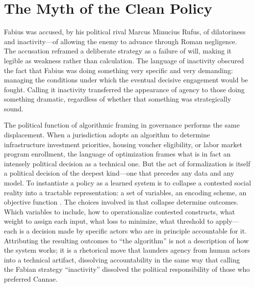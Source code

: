 \documentclass[12pt, a4paper]{article}
\begin{document}
\section{The Myth of the Clean Policy}

Fabius was accused, by his political rival Marcus Minucius Rufus, of dilatoriness and inactivity---of allowing the enemy to advance through Roman negligence. The accusation reframed a deliberate strategy as a failure of will, making it legible as weakness rather than calculation. The language of inactivity obscured the fact that Fabius was doing something very specific and very demanding: managing the conditions under which the eventual decisive engagement would be fought. Calling it inactivity transferred the appearance of agency to those doing something dramatic, regardless of whether that something was strategically sound.

The political function of algorithmic framing in governance performs the same displacement. When a jurisdiction adopts an algorithm to determine infrastructure investment priorities, housing voucher eligibility, or labor market program enrollment, the language of optimization frames what is in fact an intensely political decision as a technical one. But the act of formalization is itself a political decision of the deepest kind---one that precedes any data and any model. To instantiate a policy as a learned system is to collapse a contested social reality into a tractable representation: a set of variables, an encoding scheme, an objective function \citep{scott1998}. The choices involved in that collapse determine outcomes. Which variables to include, how to operationalize contested constructs, what weight to assign each input, what loss to minimize, what threshold to apply---each is a decision made by specific actors who are in principle accountable for it. Attributing the resulting outcomes to \enquote{the algorithm} is not a description of how the system works; it is a rhetorical move that launders agency from human actors into a technical artifact, dissolving accountability in the same way that calling the Fabian strategy \enquote{inactivity} dissolved the political responsibility of those who preferred Cannae.
\end{document}
